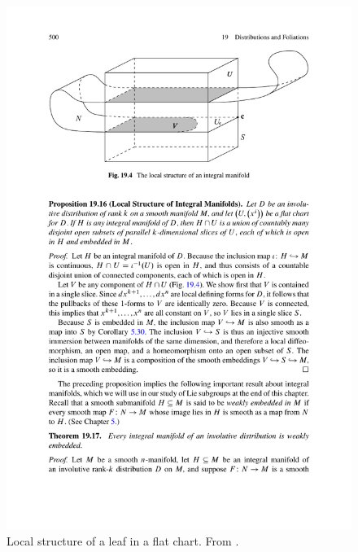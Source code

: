 \begin{figure}[tp]
    \centering
    \includegraphics[scale=0.8]{figures/frobenius_2.pdf}
    \caption{Local structure of a leaf in a flat chart. From \cite{Lee}.}
    \label{fig: frobenius2}
\end{figure}


